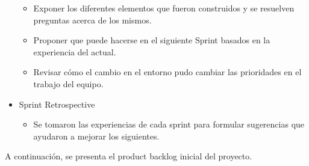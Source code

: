 \begin{itemize}
\begin{itemize}
	  \item Exponer los diferentes elementos que fueron construidos y se resuelven preguntas acerca de los mismos.
	  \item Proponer que puede hacerse en el siguiente Sprint basados en la experiencia del actual.
	  \item Revisar cómo el cambio en el entorno pudo cambiar las prioridades en el trabajo del equipo.
	\end{itemize}
  \item Sprint Retrospective
  \begin{itemize}
    \item Se tomaron las experiencias de cada sprint para formular sugerencias que ayudaron a mejorar los siguientes.

  \end{itemize}
\end{itemize}

A continuación, se presenta el product backlog inicial del proyecto.

